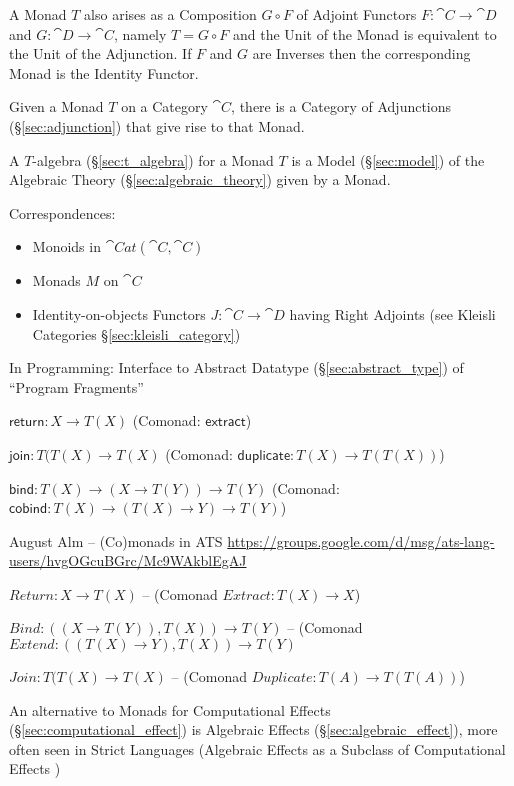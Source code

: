 A Monad $T$ also arises as a Composition $G \circ F$ of Adjoint
Functors $F : \cat{C} \rightarrow \cat{D}$ and $G : \cat{D}
\rightarrow \cat{C}$, namely $T = G \circ F$ and the Unit of the Monad
is equivalent to the Unit of the Adjunction. If $F$ and $G$ are
Inverses then the corresponding Monad is the Identity Functor.

Given a Monad $T$ on a Category $\cat{C}$, there is a Category of
Adjunctions (\S\ref{sec:adjunction}) that give rise to that Monad.

A $T$-algebra (\S\ref{sec:t_algebra}) for a Monad $T$ is a Model
(\S\ref{sec:model}) of the Algebraic Theory
(\S\ref{sec:algebraic_theory}) given by a Monad.

Correspondences: \cite{jacobs-heunen-hasuo09}
\begin{itemize}
\item Monoids in $\cat{Cat}(\cat{C},\cat{C})$
\item Monads $M$ on $\cat{C}$
\item Identity-on-objects Functors $J : \cat{C} \rightarrow \cat{D}$
  having Right Adjoints (see Kleisli Categories
  \S\ref{sec:kleisli_category})
\end{itemize}

In Programming: Interface to Abstract Datatype
(\S\ref{sec:abstract_type}) of ``Program Fragments''

$\mathsf{return} : X \rightarrow T(X)$ (Comonad: $\textsf{extract}$)

$\mathsf{join} : T(T(X) \rightarrow T(X)$ (Comonad:
$\textsf{duplicate} : T(X) \rightarrow T(T(X))$)

$\mathsf{bind} : T(X) \rightarrow (X \rightarrow T(Y)) \rightarrow
T(Y)$ (Comonad: $\mathsf{cobind} : T(X) \rightarrow (T(X) \rightarrow
Y) \rightarrow T(Y)$)


\asterism


August Alm -- (Co)monads in ATS
\url{https://groups.google.com/d/msg/ats-lang-users/hvgOGcuBGrc/Mc9WAkblEgAJ}

$Return : X \rightarrow T(X)$ -- (Comonad $Extract : T(X) \rightarrow
X$)

$Bind : ((X \rightarrow T(Y)), T(X)) \rightarrow T(Y)$ -- (Comonad
$Extend : ((T(X) \rightarrow Y), T(X)) \rightarrow T(Y)$

$Join : T(T(X) \rightarrow T(X)$ -- (Comonad $Duplicate : T(A)
\rightarrow T(T(A))$)


\asterism


An alternative to Monads for Computational Effects
(\S\ref{sec:computational_effect}) is Algebraic Effects
(\S\ref{sec:algebraic_effect}), more often seen in Strict Languages
(Algebraic Effects as a Subclass of Computational Effects
\cite{plotkin-pretnar09})

